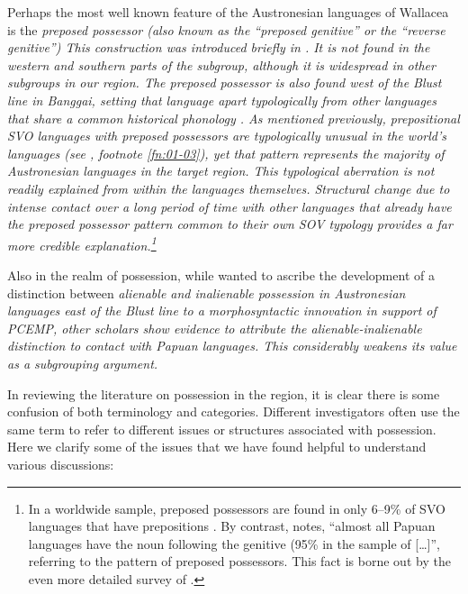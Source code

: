 Perhaps the most well known feature of the Austronesian
languages of Wallacea is the \it{preposed possessor} (also known as the ``preposed genitive''
or the ``reverse genitive'')
This construction was introduced briefly in .
It is not found in the western
and southern parts of the  subgroup,
although it is widespread in other subgroups in our region.
The preposed possessor is also found west of the Blust line in
Banggai, setting that language apart typologically from other 
languages that share a common historical phonology \citep[68]{Mead2003b}.
As mentioned previously, prepositional SVO languages with preposed
possessors are typologically unusual in the world’s languages
(see , footnote \ref{fn:01-03}), yet that pattern represents
the majority of Austronesian
languages in the target region.
This typological aberration is not readily explained
from within the languages themselves.
Structural change due to intense contact over a long period of
time with other languages that already have the preposed possessor
pattern common to their own SOV typology provides a far more
credible explanation.\footnote{
		In a worldwide sample,
		preposed possessors are found in only 6--9{\%} of SVO languages
		that have prepositions \citep{Dryer2013a,Dryer2013b,Dryer2013d}.
		By contrast, \citet[118]{Schapper2015} notes, “almost all Papuan languages
		have the noun following the genitive (95{\%} in the sample of
		\citealp{Dryer2013b} [\ldots]”,
		referring to the pattern of preposed possessors.
		This fact is borne out by the even more detailed survey
		of \citet[276--285]{SchapperGasser2023}.}

Also in the realm of possession,
while \citet[259]{Blust1993} wanted to ascribe the development of a
distinction between \it{alienable} and \it{inalienable possession} 
in Austronesian languages east of
the Blust line to a morphosyntactic innovation in support of
PCEMP, other scholars
\citep{KlamerReesinkVanStaden2008,Schapper2015,ReesinkDunn2018,
Klamer2019,SchapperGasser2023,Grimes2024}
show evidence to attribute the alienable-inalienable
distinction to contact with Papuan languages.
This considerably weakens its value as a subgrouping argument.

In reviewing the literature on possession in the region,
it is clear there is some confusion of both terminology and categories.
Different investigators often use the same term to refer to different
issues or structures associated with possession.
Here we clarify some of the issues that we have found helpful
to understand various discussions:

